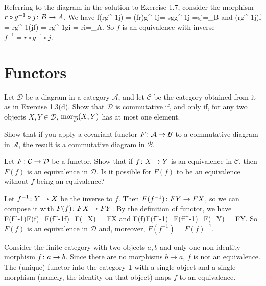 \bs
\ben[label=(\alph*)]
\item Referring to the diagram in the solution to Exercise 1.7, consider the morphism $r\circ g^{-1}\circ j\colon B\to A$. We have
\bse
f\circ (r\circ g^{-1}\circ j) = (f\circ r)\circ g^{-1}\circ j= s\circ g\circ g^{-1}\circ j =s\circ j=\id_B
\ese
and
\bse
(r\circ g^{-1}\circ j)\circ f = r\circ g^{-1}\circ (j\circ f) = r\circ g^{-1}\circ g\circ i = r\circ i=\id_A.
\ese
So $f$ is an equivalence with inverse $f^{-1}=r\circ g^{-1}\circ j$.
\item
\een
\es

\section{Functors}

\bx
\ben[label=(\alph*)]
\item  Let $\mathcal{D}$ be a diagram in a category $\mathcal{A}$, and let $\overline{\mathcal{C}}$ be the category obtained
from it as in Exercise 1.3(d). Show that $\mathcal{D}$ is commutative if, and only if, for any two objects $X, Y \in \mathcal{D}$, $\operatorname{mor}_{\overline{\mathcal{D}}}(X, Y )$ has at most one element.
\item Show that if you apply a covariant functor $F \colon \mathcal{A} \to \mathcal{B}$ to a commutative diagram in $\mathcal{A}$, the result is a commutative diagram in $\mathcal{B}$.
\een
\ex

\bs
\ben[label=(\alph*)]
\item
\item
\een
\es

\bp
Let $F \colon \mathcal{C} \to \mathcal{D}$ be a functor. Show that if $f \colon X \to Y$ is an equivalence in $\mathcal{C}$, then $F(f)$ is an equivalence in $\mathcal{D}$. Is it possible for $F(f)$ to be an equivalence without $f$ being an equivalence?
\ep

\bs
Let $f^{-1}\colon Y\to X$ be the inverse to $f$. Then $F(f^{-1})\colon FY\to FX$, so we can compose it with $F(f)\colon FX\to FY$. By the definition of functor, we have
\bse
F(f^{-1})\circ F(f)=F(f^{-1}\circ f)=F(\id_X)=\id_{FX}
\ese
and
\bse
F(f)\circ F(f^{-1})=F(f\circ f^{-1})=F(\id_Y)=\id_{FY}.
\ese
So $F(f)$ is an equivalence in $\mathcal{D}$ and, moreover, $F(f^{-1})=F(f)^{-1}$.

Consider the finite category with two objects $a,b$ and only one non-identity morphism $f\colon a\to b$. Since there are no morphisms $b\to a$, $f$ is not an equivalence. The (unique) functor into the category $\mathbf{1}$ with a single object and a single morphism (namely, the identity on that object) maps $f$ to an equivalence.
\es


